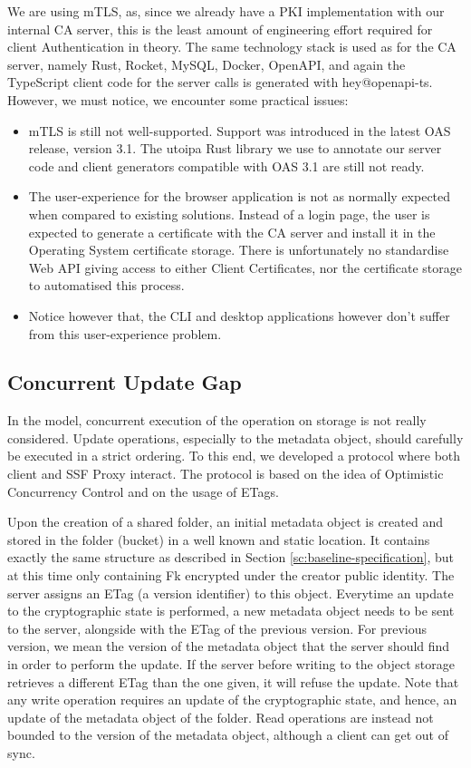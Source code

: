 We are using mTLS, as, since we already have a PKI implementation with our internal CA server, this is the least amount of engineering effort required for client Authentication in theory.
The same technology stack is used as for the CA server, namely Rust, Rocket, MySQL, Docker, OpenAPI, and again the TypeScript client code for the server calls is generated with hey@openapi-ts.
However, we must notice, we encounter some practical issues:
\begin{itemize}
    \item mTLS is still not well-supported. Support was introduced in the latest OAS release, version 3.1. The utoipa Rust library we use to annotate our server code and client generators compatible with OAS 3.1 are still not ready.
    \item The user-experience for the browser application is not as normally expected when compared to existing solutions. Instead of a login page, the user is expected to generate a certificate with the CA server and install it in the Operating System certificate storage. There is unfortunately no standardise Web API giving access to either Client Certificates, nor the certificate storage to automatised this process.
    \item Notice however that, the CLI and desktop applications however don't suffer from this user-experience problem.
\end{itemize}

\subsection{Concurrent Update Gap}

In the model, concurrent execution of the operation on storage is not really considered.
Update operations, especially to the metadata object, should carefully be executed in a strict ordering.
To this end, we developed a protocol where both client and SSF Proxy interact.
The protocol is based on the idea of Optimistic Concurrency Control and on the usage of ETags.

Upon the creation of a shared folder, an initial metadata object is created and stored in the folder (bucket) in a well known and static location.
It contains exactly the same structure as described in Section \cref{sc:baseline-specification}, but at this time only containing Fk encrypted under the creator public identity.
The server assigns an ETag (a version identifier) to this object.
Everytime an update to the cryptographic state is performed, a new metadata object needs to be sent to the server, alongside with the ETag of the previous version.
For previous version, we mean the version of the metadata object that the server should find in order to perform the update.
If the server before writing to the object storage retrieves a different ETag than the one given, it will refuse the update.
Note that any write operation requires an update of the cryptographic state, and hence, an update of the metadata object of the folder.
Read operations are instead not bounded to the version of the metadata object, although a client can get out of sync.

